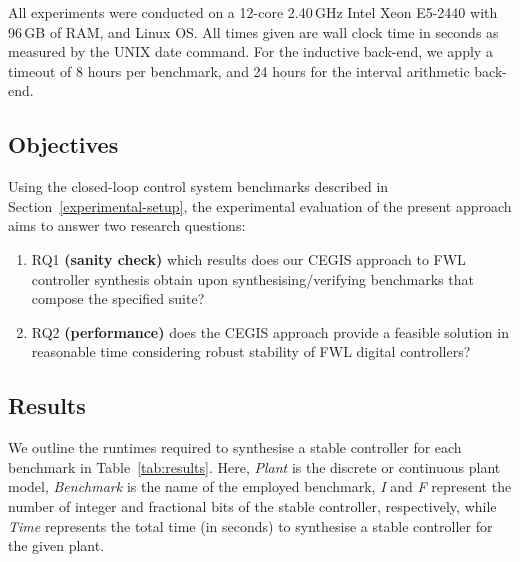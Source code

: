 \documentclass{sig-alternate-05-2015}
\begin{document}
All experiments were conducted on a 12-core 2.40\,GHz Intel Xeon E5-2440 with 96\,GB
of RAM, and Linux OS.  All times given are wall clock time in seconds as measured
by the UNIX date command.  For the inductive back-end, we apply a timeout of 8 hours
per benchmark, and 24 hours for the interval arithmetic back-end.

\subsection{Objectives}
\label{experimental-objectives}

Using the closed-loop control system benchmarks described in Section~\ref{experimental-setup}, 
the experimental evaluation of the present approach aims to answer two research questions:
%
\begin{enumerate}
	\item RQ1 \textbf{(sanity check)} which results does our CEGIS approach to FWL controller synthesis 
	obtain upon synthesising/verifying benchmarks that compose the specified suite?
  \item RQ2 \textbf{(performance)} does the CEGIS approach provide a feasible solution in reasonable time
	considering robust stability of FWL digital controllers?	
\end{enumerate}

\subsection{Results}
\label{experimental-results}

We outline the runtimes required to synthesise a stable controller for each
benchmark in Table~\ref{tab:results}.  Here, \textit{Plant} is the discrete
or continuous plant model, \textit{Benchmark} is the name of the employed
benchmark, \textit{I} and \textit{F} represent the number of integer and
fractional bits of the stable controller, respectively, while \textit{Time}
represents the total time (in seconds) to synthesise a stable controller for
the given plant.
\end{document}
